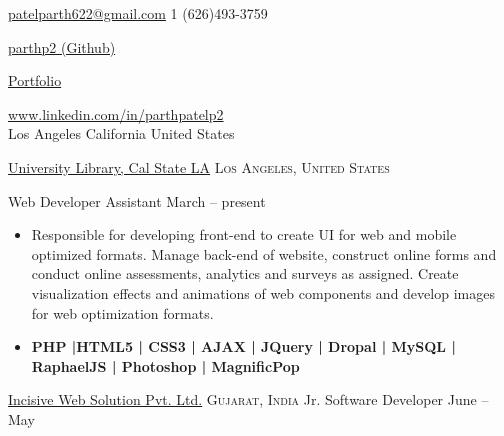 \documentclass[10pt,a4paper]{article}
\begin{document}
\sloppy  %


\nobreakvspace{0.4em}  %

\noindent\href{mailto:patelparth622.at.gmail.dot.com}{patelparth622\mbox{}@\mbox{}gmail.com}\sbull
\textsmaller{+}1 (626)493-3759\sbull
{\newnums \href{https://github.com/parthp2}{parthp2 (Github)}\sbull
{\newnums \href{http://www.patelparth.net/}{Portfolio}\sbull
{\mewmums \href{https://www.linkedin.com/in/parthpatelp2/}{www.linkedin.com/in/parthpatelp2}
\\
{Los Angeles\sbull
California\sbull
United States
}
\spacedhrule{0.0em}{-0.4em}  %




\headedsection  %
  {\href{http://web.calstatela.edu/library/}{University Library, Cal State LA}}
  {\textsc{Los Angeles, United States}} {%
  \headedsubsection
    {Web Developer Assistant}
    {March  -- present}
    {\bodytext
    {
    \begin{itemize}
        \item Responsible for developing front-end to create UI for web and mobile optimized formats. Manage back-end of website, construct online forms and conduct online assessments, analytics and surveys as assigned.
        Create visualization effects and animations of web components and develop images for web optimization formats.
        \item \textbf{\small{ PHP |HTML5 | CSS3 | AJAX | JQuery | Dropal | MySQL | RaphaelJS | Photoshop | MagnificPop  }}
    \end{itemize}}}
}

\headedsection  %
  {\href{https://www.linkedin.com/company/incisive-web-solution-pvt-ltd-/}{Incisive Web Solution Pvt. Ltd.}}
  {\textsc{Gujarat, India}} {%
  \headedsubsection
    {Jr. Software Developer}
    {June  -- May }
    {}
}

}}}
\end{document}
